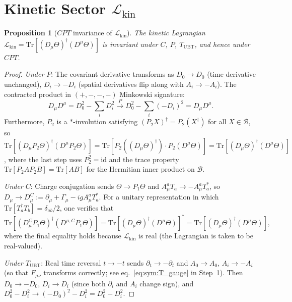 \documentclass[12pt,a4paper]{article}
\newtheorem{proposition}[theorem]{Proposition}
\theoremstyle{definition}
\theoremstyle{remark}
\begin{document}
\section{Kinetic Sector $\mathcal{L}_{\mathrm{kin}}$}
\label{sec:act:kin}

\begin{proposition}[$CPT$ invariance of $\mathcal{L}_{\mathrm{kin}}$]
\label{prop:act:kin_CPT}
The kinetic Lagrangian
$\mathcal{L}_{\mathrm{kin}} = \mathrm{Tr}[(D_\mu\Theta)^\dagger(D^\mu\Theta)]$
is invariant under $C$, $P$, $T_{\mathrm{UBT}}$, and hence under $CPT$.
\end{proposition}

\begin{proof}
\medskip
\noindent\textit{Under $P$}:
The covariant derivative transforms as
$D_0 \to D_0$ (time derivative unchanged),
$D_i \to -D_i$ (spatial derivatives flip along with $A_i \to -A_i$).
The contracted product in $(+,-,-,-)$ Minkowski signature:
\begin{equation}
  D_\mu D^\mu = D_0^2 - \sum_i D_i^2
  \xrightarrow{\;P\;} D_0^2 - \sum_i (-D_i)^2 = D_\mu D^\mu.
\end{equation}
Furthermore, $P_2$ is a $*$-involution satisfying
$(P_2 X)^\dagger = P_2(X^\dagger)$ for all $X \in \mathcal{B}$,
so
$\mathrm{Tr}[(D_\mu P_2\Theta)^\dagger(D^\mu P_2\Theta)]
= \mathrm{Tr}[P_2((D_\mu\Theta)^\dagger) \cdot P_2(D^\mu\Theta)]
= \mathrm{Tr}[(D_\mu\Theta)^\dagger(D^\mu\Theta)]$,
where the last step uses $P_2^2 = \mathrm{id}$ and the trace property
$\mathrm{Tr}[P_2 A P_2 B] = \mathrm{Tr}[AB]$ for the Hermitian inner
product on $\mathcal{B}$. \checkmark

\medskip
\noindent\textit{Under $C$}:
Charge conjugation sends $\Theta \to P_1\Theta$ and
$A_\mu^a T_a \to -A_\mu^a T_a^*$, so
$D_\mu \to D_\mu^C := \partial_\mu + \Gamma_\mu - ig A_\mu^a T_a^*$.
For a unitary representation in which
$\mathrm{Tr}[T_a^{\dagger} T_b] = \delta_{ab}/2$, one verifies that
\begin{equation}
  \mathrm{Tr}[(D_\mu^C P_1\Theta)^\dagger (D^{\mu,C} P_1\Theta)]
  = \mathrm{Tr}[(D_\mu\Theta)^\dagger(D^\mu\Theta)]^* 
  = \mathrm{Tr}[(D_\mu\Theta)^\dagger(D^\mu\Theta)],
\end{equation}
where the final equality holds because $\mathcal{L}_{\mathrm{kin}}$ is real
(the Lagrangian is taken to be real-valued). \checkmark

\medskip
\noindent\textit{Under $T_{\mathrm{UBT}}$}:
Real time reversal $t \to -t$ sends $\partial_t \to -\partial_t$ and
$A_0 \to A_0$, $A_i \to -A_i$ (so that $F_{\mu\nu}$ transforms correctly;
see eq.~\eqref{eq:sym:T_gauge} in Step~1).
Then $D_0 \to -D_0$, $D_i \to D_i$ (since both $\partial_i$ and $A_i$
change sign), and
$D_0^2 - D_i^2 \to (-D_0)^2 - D_i^2 = D_0^2 - D_i^2$. \checkmark
\end{proof}
\end{document}
